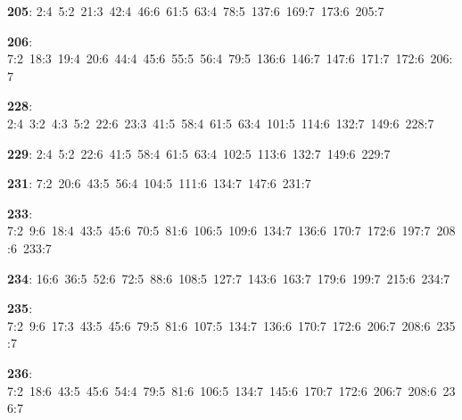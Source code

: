 \noindent \textbf{205}: 2:4\allowbreak\ 5:2\allowbreak\ 21:3\allowbreak\ 42:4\allowbreak\ 46:6\allowbreak\ 61:5\allowbreak\ 63:4\allowbreak\ 78:5\allowbreak\ 137:6\allowbreak\ 169:7\allowbreak\ 173:6\allowbreak\ 205:7\par
\noindent \textbf{206}: 7:2\allowbreak\ 18:3\allowbreak\ 19:4\allowbreak\ 20:6\allowbreak\ 44:4\allowbreak\ 45:6\allowbreak\ 55:5\allowbreak\ 56:4\allowbreak\ 79:5\allowbreak\ 136:6\allowbreak\ 146:7\allowbreak\ 147:6\allowbreak\ 171:7\allowbreak\ 172:6\allowbreak\ 206:7\par
\noindent \textbf{228}: 2:4\allowbreak\ 3:2\allowbreak\ 4:3\allowbreak\ 5:2\allowbreak\ 22:6\allowbreak\ 23:3\allowbreak\ 41:5\allowbreak\ 58:4\allowbreak\ 61:5\allowbreak\ 63:4\allowbreak\ 101:5\allowbreak\ 114:6\allowbreak\ 132:7\allowbreak\ 149:6\allowbreak\ 228:7\par
\noindent \textbf{229}: 2:4\allowbreak\ 5:2\allowbreak\ 22:6\allowbreak\ 41:5\allowbreak\ 58:4\allowbreak\ 61:5\allowbreak\ 63:4\allowbreak\ 102:5\allowbreak\ 113:6\allowbreak\ 132:7\allowbreak\ 149:6\allowbreak\ 229:7\par
\noindent \textbf{231}: 7:2\allowbreak\ 20:6\allowbreak\ 43:5\allowbreak\ 56:4\allowbreak\ 104:5\allowbreak\ 111:6\allowbreak\ 134:7\allowbreak\ 147:6\allowbreak\ 231:7\par
\noindent \textbf{233}: 7:2\allowbreak\ 9:6\allowbreak\ 18:4\allowbreak\ 43:5\allowbreak\ 45:6\allowbreak\ 70:5\allowbreak\ 81:6\allowbreak\ 106:5\allowbreak\ 109:6\allowbreak\ 134:7\allowbreak\ 136:6\allowbreak\ 170:7\allowbreak\ 172:6\allowbreak\ 197:7\allowbreak\ 208:6\allowbreak\ 233:7\par
\noindent \textbf{234}: 16:6\allowbreak\ 36:5\allowbreak\ 52:6\allowbreak\ 72:5\allowbreak\ 88:6\allowbreak\ 108:5\allowbreak\ 127:7\allowbreak\ 143:6\allowbreak\ 163:7\allowbreak\ 179:6\allowbreak\ 199:7\allowbreak\ 215:6\allowbreak\ 234:7\par
\noindent \textbf{235}: 7:2\allowbreak\ 9:6\allowbreak\ 17:3\allowbreak\ 43:5\allowbreak\ 45:6\allowbreak\ 79:5\allowbreak\ 81:6\allowbreak\ 107:5\allowbreak\ 134:7\allowbreak\ 136:6\allowbreak\ 170:7\allowbreak\ 172:6\allowbreak\ 206:7\allowbreak\ 208:6\allowbreak\ 235:7\par
\noindent \textbf{236}: 7:2\allowbreak\ 18:6\allowbreak\ 43:5\allowbreak\ 45:6\allowbreak\ 54:4\allowbreak\ 79:5\allowbreak\ 81:6\allowbreak\ 106:5\allowbreak\ 134:7\allowbreak\ 145:6\allowbreak\ 170:7\allowbreak\ 172:6\allowbreak\ 206:7\allowbreak\ 208:6\allowbreak\ 236:7\par
